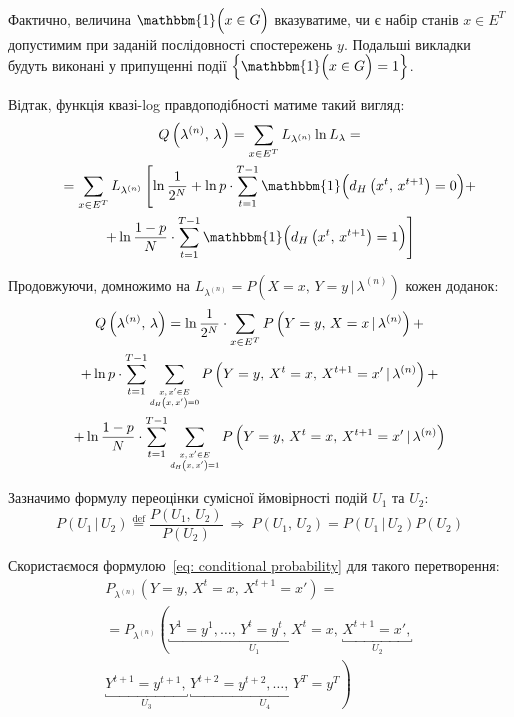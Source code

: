 Фактично, величина $\mathbbm{1} \Bigl( x \in G \Bigr)$ вказуватиме, чи є набір станів $x \in E^T$ допустимим при заданій послідовності спостережень $y$. Подальші викладки будуть виконані у припущенні події $\left\{ \mathbbm{1} \Bigl( x \in G \Bigr) = 1 \right\}$.

Відтак, функція квазі-log правдоподібності матиме такий вигляд:
\begin{multline*}
    Q\left( \lambda^{(n)},\,\lambda \right) = \sum\limits_{x \in E^T}L_{\lambda^{(n)}} \ln L_{\lambda} = \\
    \hspace{5.5mm} = \sum\limits_{x \in E^T}L_{\lambda^{(n)}} \left[ \ln\frac{1}{2^N} + \ln p \cdot \sum\limits_{t=1}^{T-1} \mathbbm{1} \Bigl( d_H\left( x^t,\,x^{t+1} \right) = 0 \Bigr) + \right. \\ 
    \left. + \ln\frac{1-p}{N} \cdot \sum\limits_{t=1}^{T-1} \mathbbm{1} \Bigl( d_H\left( x^t,\,x^{t+1} \right) = 1 \Bigr) \right]
\end{multline*}

Продовжуючи, домножимо на $L_{\lambda^{(n)}}=P\left( X=x,\, Y=y \,|\, \lambda^{(n)} \right)$ кожен доданок:
\begin{multline*}
    Q\left( \lambda^{(n)},\,\lambda \right) = \ln\frac{1}{2^N} \cdot \sum\limits_{x \in E^T} P\left( Y=y,\, X=x \,|\, \lambda^{(n)} \right) + \\
    + \ln p \cdot \sum\limits_{t=1}^{T-1} \sum\limits_{\scaleq[0.8]{\substack{x,\,x' \in E \\ d_H\left( x,\,x' \right) = 0}}} P\left( Y=y,\, X^t=x,\, X^{t+1}=x' \,|\, \lambda^{(n)} \right) + \\
    + \ln\frac{1-p}{N} \cdot \sum\limits_{t=1}^{T-1} \sum\limits_{\scaleq[0.8]{\substack{x,\,x' \in E \\ d_H\left( x,\,x' \right) = 1}}} P\left( Y=y,\, X^t=x,\, X^{t+1}=x' \,|\, \lambda^{(n)} \right)
\end{multline*}

Зазначимо формулу переоцінки сумісної ймовірності подій $U_1$ та $U_2:$
\begin{equation}\label{eq: conditional probability}
    P\left( U_1 \,|\, U_2 \right) \overset{\mathrm{def}}{=} \frac{P\left( U_1,\,U_2 \right)}{P(U_2)}\ \Longrightarrow\ P\left( U_1,\,U_2 \right) = P\left( U_1 \,|\, U_2 \right) P(U_2)
\end{equation}

Скористаємося формулою~\eqref{eq: conditional probability} для такого перетворення:
\begin{multline*}
    P_{\lambda^{(n)}} \left( Y=y,\, X^t=x,\, X^{t+1}=x' \right) = \\
    = P_{\lambda^{(n)}} \left( \underbracket{Y^1=y^1,\ldots,\,Y^t=y^t,\,X^t=x,}_{U_1}\, \underbracket{X^{t+1}=x',}_{U_2}\, \right. \\
    \left. \underbracket{Y^{t+1}=y^{t+1},}_{U_3}\, \underbracket{Y^{t+2}=y^{t+2},\ldots,\,Y^{T}=y^{T}}_{U_4} \right)
\end{multline*}

